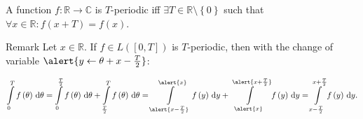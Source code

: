\begin{frame}
	\begin{definition}
		A function $f\colon\mathds{R}\to\mathds{C}$ is
		$T$-\alert{periodic} iff
		\begin{math}
			\exists T\in\mathds{R}\setminus\left\{0\right\}
		\end{math}
		such that
		\begin{math}
			\forall x\in\mathds{R}:
			f\left(x+T\right)=
			f\left(x\right)
		\end{math}.
	\end{definition}
	\begin{block}{Remark}
		Let $x\in\mathds{R}$.
		If $f\in L\left(\left[0,T\right]\right)$ is $T$-periodic,
		then with the change of variable
		\begin{math}
			\alert{
				y\leftarrow\theta+x-\frac{T}{2}
			}
		\end{math}:

		\begin{equation*}
			\int\limits_{0}^{T}f\left(\theta\right)\dl\theta=
			\int\limits_{0}^{\frac{T}{2}}f\left(\theta\right)\dl\theta+
			\int\limits_{\frac{T}{2}}^{T}f\left(\theta\right)\dl\theta=
			\int\limits_{\alert{x-\frac{T}{2}}}^{\alert{x}}f\left(y\right)\dl y+
			\int\limits_{\alert{x}}^{\alert{x+\frac{T}{2}}}f\left(y\right)\dl y=
			\int\limits_{x-\frac{T}{2}}^{x+\frac{T}{2}}f\left(y\right)\dl y.
		\end{equation*}
	\end{block}
\end{frame}

